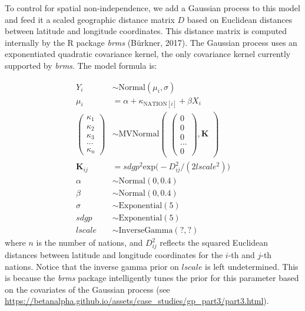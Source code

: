 \documentclass[
  man,floatsintext]{apa6}
\begin{document}
\newpage

To control for spatial non-independence, we add a Gaussian process to this model and feed it a scaled geographic distance matrix \(D\) based on Euclidean distances between latitude and longitude coordinates. This distance matrix is computed internally by the R package \emph{brms} (Bürkner, 2017). The Gaussian process uses an exponentiated quadratic covariance kernel, the only covariance kernel currently supported by \emph{brms}. The model formula is:

\[
\begin{aligned}
Y_{i} &\sim \text{Normal}(\mu_{i},\sigma) \\
\mu_{i} &= \alpha + \kappa_{\text{NATION}[i]} + \beta X_{i} \\
\begin{pmatrix}
\kappa_{1} \\ \kappa_{2} \\ \kappa_{3} \\ ... \\ \kappa_{n}
\end{pmatrix} &\sim \text{MVNormal}
\begin{pmatrix}
\begin{pmatrix}
0 \\ 0 \\ 0 \\ ... \\ 0
\end{pmatrix},\textbf{K}
\end{pmatrix}\\
\textbf{K}_{ij} &= sdgp^2 \text{exp} \big (-D_{ij}^2 / (2 lscale^2) \big )\\
\alpha &\sim \text{Normal}(0, 0.4) \\
\beta &\sim \text{Normal}(0, 0.4) \\
\sigma &\sim \text{Exponential}(5) \\
sdgp &\sim \text{Exponential}(5) \\
lscale &\sim \text{InverseGamma}(?,?)
\end{aligned}
\]
where \(n\) is the number of nations, and \(D^2_{ij}\) reflects the squared Euclidean distances between latitude and longitude coordinates for the \(i\)-th and \(j\)-th nations. Notice that the inverse gamma prior on \(lscale\) is left undetermined. This is because the \emph{brms} package intelligently tunes the prior for this parameter based on the covariates of the Gaussian process (see \url{https://betanalpha.github.io/assets/case_studies/gp_part3/part3.html}).
\end{document}
